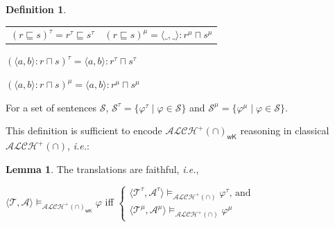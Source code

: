 \documentclass[letterpaper]{article} %
\theoremstyle{definition}
\newtheorem{lemma}{Lemma}
\theoremstyle{definition}
\newtheorem{definition}{Definition}
\theoremstyle{definition}
\theoremstyle{definition}
\theoremstyle{definition}
\begin{document}
\begin{definition}
\begin{center}
{\begin{tabular}{ll}
$(r\sqsubseteq s)^{\tau}=r^{\tau}\sqsubseteq s^{\tau}$ & $(r\sqsubseteq s)^{\mu}=\langle\_,\_\rangle:r^{\mu}\sqcap s^{\mu}$\\


\end{tabular}


    $(\langle a,b\rangle: r\sqcap s)^{\tau}=\langle a,b\rangle: r^{\tau}\sqcap  s^{\tau}$ 
    
    $(\langle a,b\rangle: r\sqcap s)^{\mu}=\langle a,b\rangle: r^{\mu}\sqcap s^{\mu}$
}
\end{center}


\noindent For a set of sentences $\mathcal{S}$, $\mathcal{S}^{\tau}=\lbrace\varphi^{\tau}\mid \varphi\in\mathcal{S}\rbrace$ and $\mathcal{S}^{\mu}=\lbrace\varphi^{\mu}\mid \varphi\in\mathcal{S}\rbrace$.
\end{definition}

\noindent This definition is sufficient to encode $\mathcal{ALCH}^+(\cap)_{\mathsf{wK}}$ reasoning in classical $\mathcal{ALCH}^+(\cap)$, \emph{i.e.}:



\begin{lemma}\label{lem:alh-wk-to-alh}
    The translations are faithful, \emph{i.e.},

    \begin{center}
    $\langle\mathcal{T},\mathcal{A}\rangle\vDash_{\mathcal{ALCH}^+(\cap)_{\mathsf{wK}}}\varphi$ iff $\begin{cases}
    \langle\mathcal{T}^{\tau},\mathcal{A}^{\tau}\rangle\vDash_{\mathcal{ALCH^+(\cap)}}\varphi^{\tau} \mbox{, and}\\
    \langle\mathcal{T}^{\mu},\mathcal{A}^{\mu}\rangle\vDash_{\mathcal{ALCH^+(\cap)}}\varphi^{\mu}
    
    \end{cases}$
    \end{center}
\end{lemma}
\end{document}
